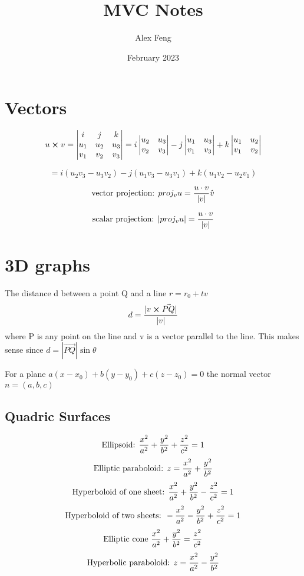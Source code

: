 \documentclass{article}
\title{MVC Notes}
\author{Alex Feng}
\date{February 2023}
\begin{document}
    
\maketitle

\section{Vectors}
$$u \cross v = 
\begin{vmatrix}
    i & j & k \\
    u_1 & u_2 & u_3 \\
    v_1 & v_2 & v_3
\end{vmatrix}
 = i\begin{vmatrix} 
    u_2 & u_3 \\ v_2 & v_3
    
\end{vmatrix}
- j\begin{vmatrix}
    u_1 & u_3 \\
    v_1 & v_3
\end{vmatrix}
+k\begin{vmatrix}
    u_1 & u_2 \\
    v_1 & v_2
\end{vmatrix}$$

$$= i(u_2 v_3 - u_3 v_2) - j(u_1 v_3 - u_3 v_1) + k(u_1 v_2 - u_2 v_1)$$

$$\textnormal{vector projection:  } proj_v u = \frac{u \cdot v}{|v|} \hat{v}$$ 

$$\textnormal{scalar projection:  } |proj_v u| = \frac{u \cdot v}{|v|}$$

\section{3D graphs}

The distance d between a point Q and a line $r=r_0 +tv$
$$d = \frac{|v \cross \Vec{PQ}|}{|v|} $$
where P is any point on the line and v is a vector parallel to the line. This makes sense since $d = |\Vec{PQ}| \sin \theta$

\vskip 30pt

\noindent For a plane $a(x-x_0 ) + b (y- y_0 ) + c(z- z_0) = 0$
the normal vector $n = (a,b,c)$
\pagebreak
\subsection{Quadric Surfaces}
$$\textnormal{Ellipsoid: }\frac{x^2}{a^2} + \frac{y^2}{b^2} + \frac{z^2}{c^2} = 1$$
$$\textnormal{Elliptic paraboloid: }z = \frac{x^2}{a^2} + \frac{y^2}{b^2}$$
$$\textnormal{Hyperboloid of one sheet: }\frac{x^2}{a^2}+\frac{y^2}{b^2}-\frac{z^2}{c^2}=1$$
$$\textnormal{Hyperboloid of two sheets: }-\frac{x^2}{a^2}-\frac{y^2}{b^2}+\frac{z^2}{c^2}=1$$
$$\textnormal{Elliptic cone }\frac{x^2}{a^2}+\frac{y^2}{b^2}=\frac{z^2}{c^2}$$
$$\textnormal{Hyperbolic paraboloid: }z=\frac{x^2}{a^2}-\frac{y^2}{b^2}$$
\end{document}
